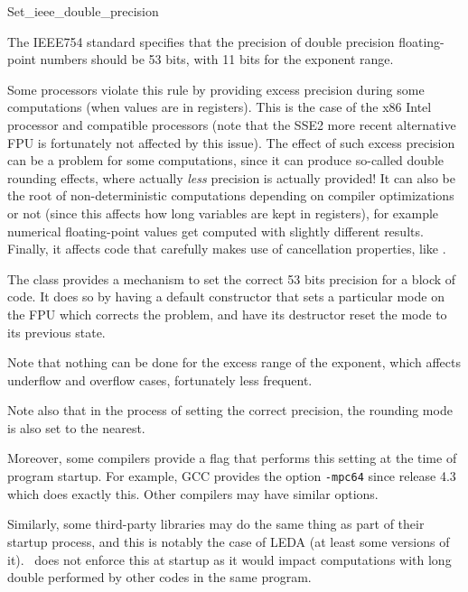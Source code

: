 
\begin{ccRefClass}{Set_ieee_double_precision}
\label{set_ieee_double_precision}

\ccDefinition

The IEEE754 standard specifies that the precision of double precision
floating-point numbers should be 53 bits, with 11 bits for the exponent range.

Some processors violate this rule by providing excess precision during some
computations (when values are in registers).  This is the case of the x86
Intel processor and compatible processors (note that the SSE2 more recent
alternative FPU is fortunately not affected by this issue).  The effect of such
excess precision can be a problem for some computations, since it can produce
so-called double rounding effects, where actually \emph{less} precision is
actually provided!  It can also be the root of non-deterministic computations
depending on compiler optimizations or not (since this affects how long
variables are kept in registers), for example numerical floating-point
values get computed with slightly different results.  Finally, it affects code
that carefully makes use of cancellation properties, like .

The class  provides a mechanism to set
the correct 53 bits precision for a block of code.  It does so by having
a default constructor that sets a particular mode on the FPU which corrects
the problem, and have its destructor reset the mode to its previous state.

Note that nothing can be done for the excess range of the exponent, which
affects underflow and overflow cases, fortunately less frequent.

Note also that in the process of setting the correct precision, the rounding
mode is also set to the nearest.

Moreover, some compilers provide a flag that performs this setting at the
time of program startup.  For example, GCC provides the option \texttt{-mpc64}
since release 4.3 which does exactly this.  Other compilers may have similar
options.

Similarly, some third-party libraries may do the same thing as part of their
startup process, and this is notably the case of LEDA (at least some versions
of it).  \cgal\ does not enforce this at startup as it would impact
computations with long double performed by other codes in the same program.


\end{ccRefClass}
